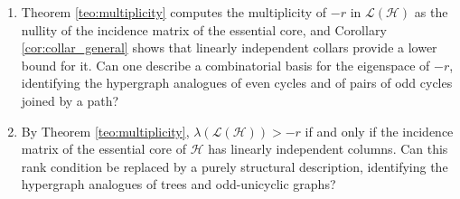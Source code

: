 \documentclass[12pt,reqno]{amsart}
\begin{document}
\begin{enumerate}
\item Theorem \ref{teo:multiplicity} computes the multiplicity of $-r$ in $\mathcal{L}(\mathcal{H})$ as the nullity of the incidence matrix of the essential core, and Corollary \ref{cor:collar_general} shows that linearly independent collars provide a lower bound for it. Can one describe a combinatorial basis for the eigenspace of $-r$, identifying the hypergraph analogues of even cycles and of pairs of odd cycles joined by a path?

\item By Theorem \ref{teo:multiplicity}, $\lambda(\mathcal{L}(\mathcal{H})) > -r$ if and only if the incidence matrix of the essential core of $\mathcal{H}$ has linearly independent columns. Can this rank condition be replaced by a purely structural description, identifying the hypergraph analogues of trees and odd-unicyclic graphs?
\end{enumerate}



\end{document}
